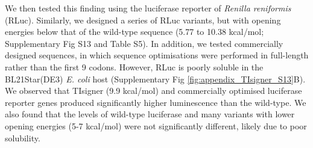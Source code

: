 We then tested this finding using the luciferase reporter of \textit{Renilla reniformis} (RLuc). Similarly, we designed a series of RLuc variants, but with opening energies below that of the wild-type sequence (5.77 to 10.38 kcal/mol; Supplementary Fig S13 and Table S5). In addition, we tested commercially designed sequences, in which sequence optimisations were performed in full-length rather than the first 9 codons. However, RLuc is poorly soluble in the BL21Star(DE3) \textit{E. coli} host (Supplementary Fig \ref{fig:appendix_TIsigner_S13}B). We observed that TIsigner (9.9 kcal/mol) and commercially optimised luciferase reporter genes produced significantly higher luminescence than the wild-type. We also found that the levels of wild-type luciferase and many variants with lower opening energies (5-7 kcal/mol) were not significantly different, likely due to poor solubility.

